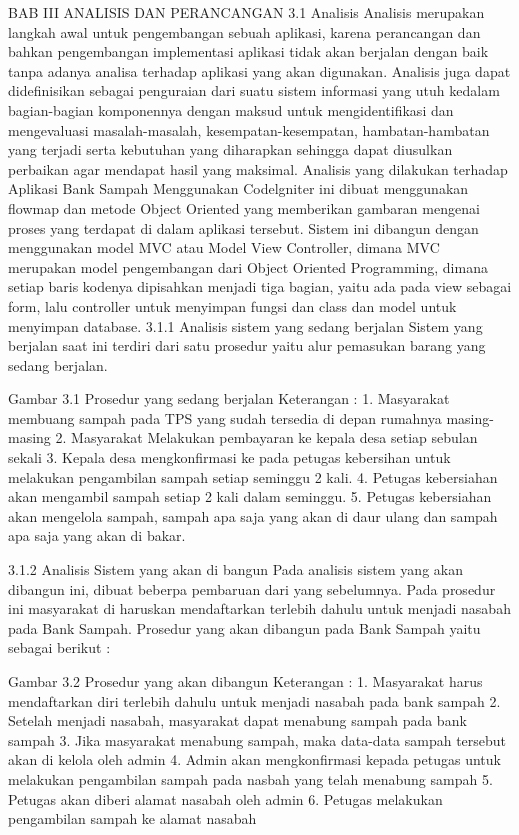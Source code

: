 BAB III
ANALISIS DAN PERANCANGAN
3.1	Analisis
Analisis merupakan langkah awal untuk pengembangan sebuah aplikasi, karena perancangan dan bahkan pengembangan implementasi aplikasi tidak akan berjalan dengan baik tanpa adanya analisa terhadap aplikasi yang akan digunakan. Analisis juga dapat didefinisikan sebagai penguraian dari suatu sistem informasi yang utuh kedalam bagian-bagian komponennya dengan maksud untuk mengidentifikasi dan mengevaluasi masalah-masalah, kesempatan-kesempatan, hambatan-hambatan yang terjadi serta kebutuhan yang diharapkan sehingga dapat diusulkan perbaikan agar mendapat hasil yang maksimal. 
Analisis yang dilakukan terhadap Aplikasi Bank Sampah Menggunakan Codelgniter ini dibuat menggunakan flowmap dan metode Object Oriented yang memberikan gambaran mengenai proses yang terdapat di dalam aplikasi tersebut. 
Sistem ini dibangun dengan menggunakan model MVC atau Model View Controller, dimana MVC merupakan  model pengembangan dari Object Oriented Programming, dimana setiap baris kodenya dipisahkan menjadi tiga bagian, yaitu ada pada view sebagai form, lalu controller untuk menyimpan fungsi dan class dan model untuk menyimpan database.
3.1.1	Analisis sistem yang sedang berjalan
Sistem yang berjalan saat ini terdiri dari satu prosedur yaitu alur pemasukan barang yang sedang berjalan.
 
Gambar 3.1 Prosedur yang sedang berjalan
Keterangan :
1.	Masyarakat membuang sampah pada TPS yang sudah tersedia di depan rumahnya masing-masing
2.	Masyarakat Melakukan pembayaran ke kepala desa setiap sebulan sekali
3.	Kepala desa mengkonfirmasi ke pada petugas kebersihan untuk melakukan pengambilan sampah setiap seminggu 2 kali.
4.	Petugas kebersiahan akan mengambil sampah setiap 2 kali dalam seminggu.
5.	Petugas kebersiahan akan mengelola sampah, sampah apa saja yang akan di daur ulang dan sampah apa saja yang akan di bakar.

3.1.2	Analisis Sistem yang akan di bangun
Pada analisis sistem yang akan dibangun ini, dibuat beberpa pembaruan dari yang  sebelumnya. Pada prosedur ini masyarakat di haruskan mendaftarkan terlebih dahulu untuk menjadi nasabah pada Bank Sampah. Prosedur yang akan dibangun pada Bank Sampah yaitu sebagai berikut :
 
Gambar 3.2 Prosedur yang akan dibangun
Keterangan :
1.	Masyarakat harus mendaftarkan diri terlebih dahulu untuk menjadi nasabah pada bank sampah
2.	Setelah menjadi nasabah, masyarakat dapat menabung sampah pada bank sampah
3.	Jika masyarakat menabung sampah, maka data-data sampah tersebut akan di kelola oleh admin 
4.	Admin akan mengkonfirmasi kepada petugas untuk melakukan pengambilan sampah pada nasbah yang telah menabung sampah
5.	Petugas akan diberi alamat nasabah oleh admin
6.	Petugas melakukan pengambilan sampah ke alamat nasabah

